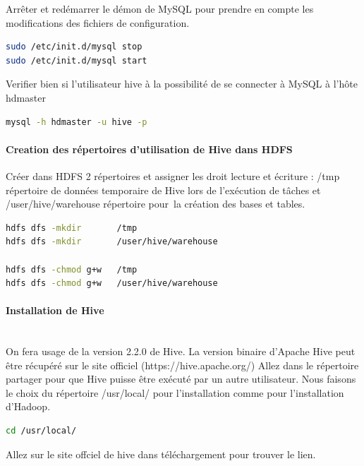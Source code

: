 \documentclass[12pt,french]{book}
\begin{document}
Arrêter et redémarrer le démon de MySQL pour prendre en compte les modifications des fichiers de configuration.

\begin{lstlisting}[language=bash, frame=single]
sudo /etc/init.d/mysql stop
sudo /etc/init.d/mysql start
\end{lstlisting}

Verifier bien si l’utilisateur hive à la possibilité de se connecter à MySQL à l’hôte hdmaster 

\begin{lstlisting}[language=bash, frame=single]
mysql -h hdmaster -u hive -p
\end{lstlisting}

\paragraph{Creation des répertoires d’utilisation de Hive dans HDFS}

Créer dans HDFS  2 répertoires et assigner les droit lecture et écriture :  /tmp répertoire de données temporaire de Hive lors de l’exécution de tâches et /user/hive/warehouse répertoire pour la création des bases et tables. 

\begin{lstlisting}[language=bash, frame=single]
hdfs dfs -mkdir       /tmp
hdfs dfs -mkdir       /user/hive/warehouse

hdfs dfs -chmod g+w   /tmp
hdfs dfs -chmod g+w   /user/hive/warehouse
\end{lstlisting}

\paragraph{Installation de Hive}\mbox{}\\

On fera usage de la version 2.2.0 de Hive.
La version binaire d’Apache Hive peut être récupéré sur le site officiel (https://hive.apache.org/)
Allez dans le répertoire partager pour que Hive puisse être exécuté par un autre utilisateur.
Nous faisons le choix du répertoire /usr/local/ pour l’installation comme pour l’installation d’Hadoop.

\begin{lstlisting}[language=bash, frame=single]
cd /usr/local/ 
\end{lstlisting}

Allez sur le site offciel de hive dans téléchargement pour trouver le lien.
\end{document}
